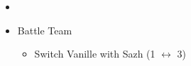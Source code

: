 \begin{menu}
\begin{itemize}
\begin{itemize}
					      \item {}%
					            {\paradigmline{\med}{\com}{\com}}%
					            {\paradigmline[2]{\textit{(\rav)}}{\textit{\com}}{\textit{\com}}}%
					            {\paradigmline{(\med)}{\sen}{(\sen)}}%
					            {\paradigmline{\rav}{\rav}{\syn}}%
					            {\paradigmline{\sab}{\rav}{\rav}}%
					            {\paradigmline{\rav}{\rav}{\rav}}
				\item Battle Team
				      \begin{itemize}
					      \item Switch Vanille with Sazh (1 $\leftrightarrow$ 3)
				      \end{itemize}
			\end{itemize}
		\end{itemize}
	\end{menu}
	\vfill
	\renewcommand{\first}{[1] Tireless Charge (\com)/\com/\med)}
	\renewcommand{\second}{[2] Aggression (\com/\com/\rav)}
	\renewcommand{\third}{[3] Consolidation (\sen/\sen/\med)}
	\renewcommand{\fourth}{[4] Malevolence (\syn/(\rav)/\rav)}
	\renewcommand{\fifth}{[5] Smart Bomb (\rav/\rav/\sab)}
	\renewcommand{\sixth}{[6] Tri-Disaster (\rav/\rav/\rav)}
